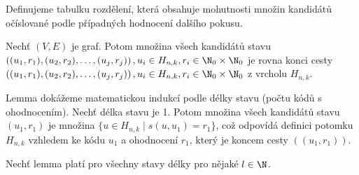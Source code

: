 Definujeme tabulku rozdělení, která obsahuje mohutnosti množin kandidátů očíslované podle případných hodnocení dalšího pokusu. 



\begin{lemma}\label{kandidatacesta}
    Nechť $(V, E)$ je graf. Potom množina všech kandidátů stavu $\left((u_1, r_1), (u_2,r_2), \dots, (u_j,r_j)\right), u_i \in H_{n,k}, r_i \in \N _0 \times \N _0$ je rovna konci cesty $\left((u_1, r_1), (u_2,r_2), \dots, (u_j,r_j)\right), u_i \in H_{n,k}, r_i \in \N _0 \times \N _0$ z vrcholu $H_{n,k}$.
\end{lemma}
\begin{dukaz}
    Lemma dokážeme matematickou indukcí podle délky stavu (počtu kódů s ohodnocením). Nechť délka stavu je 1. Potom množina všech kandidátů stavu $(u_1, r_1)$ je množina $\{u \in H_{n,k} \mid s(u,u_1) = r_1\}$, což odpovídá definici potomku $H_{n,k}$ vzhledem ke kódu $u_1$ a ohodnocení $r_1$, který je koncem cesty $((u_1, r_1))$.

    Nechť lemma platí pro všechny stavy délky pro nějaké $l \in \N$. 
\end{dukaz}




